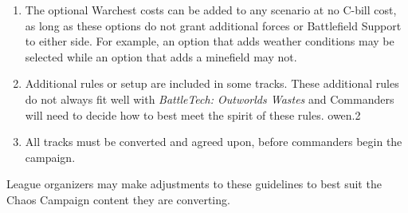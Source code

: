 \begin{enumerate}
\item The optional Warchest costs can be added to any scenario at no C-bill cost, as long as these options do not grant additional forces or Battlefield Support to either side.
For example, an option that adds weather conditions may be selected while an option that adds a minefield may not.

\item Additional rules or setup are included in some tracks.
These additional rules do not always fit well with \emph{BattleTech: Outworlds Wastes} and Commanders will need to decide how to best meet the spirit of these rules.
owen.2
\item All tracks must be converted and agreed upon, before commanders begin the campaign.

\end{enumerate}

League organizers may make adjustments to these guidelines to best suit the Chaos Campaign content they are converting.
